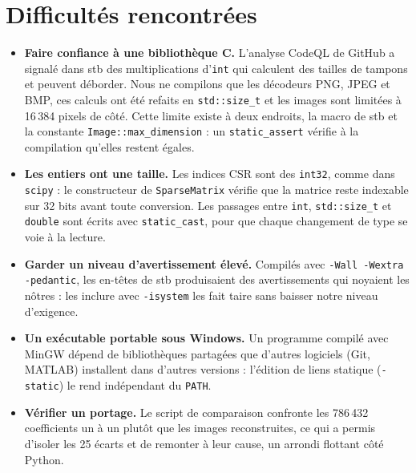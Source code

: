 \documentclass[10pt,a4paper]{article}
\newcommand{\code}[1]{\texttt{#1}}
\begin{document}
\section{Difficultés rencontrées}
\begin{itemize}
  \item \textbf{Faire confiance à une bibliothèque C.} L'analyse CodeQL de GitHub a signalé dans stb
    des multiplications d'\code{int} qui calculent des tailles de tampons et peuvent déborder. Nous
    ne compilons que les décodeurs PNG, JPEG et BMP, ces calculs ont été refaits en
    \code{std::size\_t} et les images sont limitées à 16\,384 pixels de côté. Cette limite existe à
    deux endroits, la macro de stb et la constante \code{Image::max\_dimension} : un
    \code{static\_assert} vérifie à la compilation qu'elles restent égales.
  \item \textbf{Les entiers ont une taille.} Les indices CSR sont des \code{int32}, comme dans
    \code{scipy} : le constructeur de \code{SparseMatrix} vérifie que la matrice reste indexable
    sur 32 bits avant toute conversion. Les passages entre \code{int}, \code{std::size\_t} et
    \code{double} sont écrits avec \code{static\_cast}, pour que chaque changement de type se voie
    à la lecture.
  \item \textbf{Garder un niveau d'avertissement élevé.} Compilés avec
    \code{-Wall -Wextra -pedantic}, les en-têtes de stb produisaient des avertissements qui
    noyaient les nôtres : les inclure avec \code{-isystem} les fait taire sans baisser notre niveau
    d'exigence.
  \item \textbf{Un exécutable portable sous Windows.} Un programme compilé avec MinGW dépend de
    bibliothèques partagées que d'autres logiciels (Git, MATLAB) installent dans d'autres versions :
    l'édition de liens statique (\code{-static}) le rend indépendant du \code{PATH}.
  \item \textbf{Vérifier un portage.} Le script de comparaison confronte les 786\,432 coefficients
    un à un plutôt que les images reconstruites, ce qui a permis d'isoler les 25 écarts et de
    remonter à leur cause, un arrondi flottant côté Python.
\end{itemize}
\end{document}
